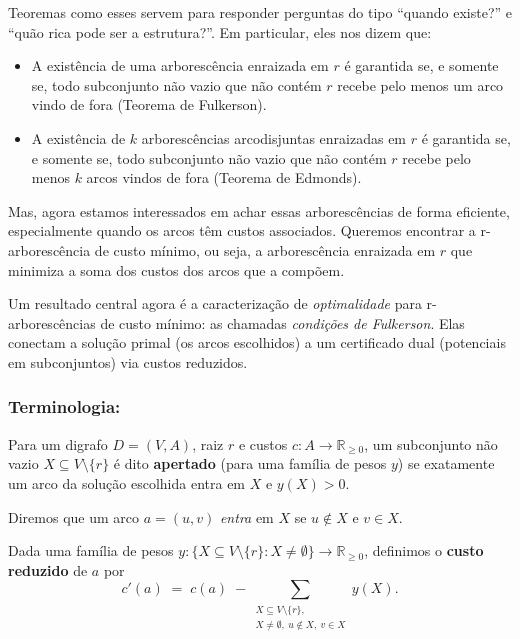 Teoremas como esses servem para responder perguntas do tipo “quando existe?” e “quão rica pode ser a estrutura?”. Em particular, eles nos dizem que:
\begin{itemize}\setlength{\itemsep}{2pt}
	\item A existência de uma arborescência enraizada em \(r\) é garantida se, e somente se, todo subconjunto não vazio que não contém \(r\) recebe pelo menos um arco vindo de fora (Teorema de Fulkerson).
	\item A existência de \(k\) arborescências arcodisjuntas enraizadas em \(r\) é garantida se, e somente se, todo subconjunto não vazio que não contém \(r\) recebe pelo menos \(k\) arcos vindos de fora (Teorema de Edmonds).
\end{itemize}


Mas, agora estamos interessados em achar essas arborescências de forma eficiente, especialmente quando os arcos têm custos associados. Queremos encontrar a r-arborescência de custo mínimo, ou seja, a arborescência enraizada em \(r\) que minimiza a soma dos custos dos arcos que a compõem.


Um resultado central agora é a caracterização de \emph{optimalidade} para r-arborescências de custo mínimo: as chamadas \emph{condições de Fulkerson}. Elas conectam a solução primal (os arcos escolhidos) a um certificado dual (potenciais em subconjuntos) via custos reduzidos.

\subsubsection{Terminologia:}

Para um digrafo $D=(V,A)$, raiz $r$ e custos $c:A\to \mathbb{R}_{\ge 0}$, um subconjunto não vazio $X\subseteq V\setminus\{r\}$ é dito \textbf{apertado} (para uma família de pesos $y$) se exatamente um arco da solução escolhida entra em $X$ e $y(X)>0$.


Diremos que um arco $a=(u,v)$ \emph{entra} em $X$ se $u\notin X$ e $v\in X$.


Dada uma família de pesos $y: \{X\subseteq V\setminus\{r\}: X\neq\emptyset\}\to \mathbb{R}_{\ge 0}$, definimos o \textbf{custo reduzido} de $a$ por
\[
	c'(a) \;=\; c(a)\; - \sum_{\substack{X\subseteq V\setminus\{r\},\\ X\neq\emptyset,\ u\notin X,\ v\in X}} y(X).
\]


